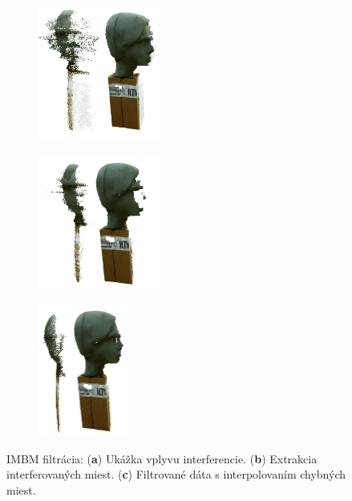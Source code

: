 \begin{figure}[h]
	\centering
	\begin{subfigure}[b]{0.32\textwidth}
		\centering
		\includegraphics[height=4.4cm]{figures/prepared_models_a.png}
		\caption{}
		\label{fig:imbm:result:a}
	\end{subfigure}
	\hfill
	\begin{subfigure}[b]{0.32\textwidth}
		\centering
		\includegraphics[height=4.4cm]{figures/prepared_models_b.png}
		\caption{}
		\label{fig:imbm:result:b}
	\end{subfigure}
	\hfill
	\begin{subfigure}[b]{0.32\textwidth}
		\centering
		\includegraphics[height=4.4cm]{figures/prepared_models_c.png}
		\caption{}
		\label{fig:imbm:result:c}
	\end{subfigure}
	\caption{IMBM filtrácia: (\textbf{a}) Ukážka vplyvu interferencie. (\textbf{b}) Extrakcia interferovaných miest. (\textbf{c}) Filtrované dáta s interpolovaním chybných miest.}
	\label{fig:imbm:result}
\end{figure}

